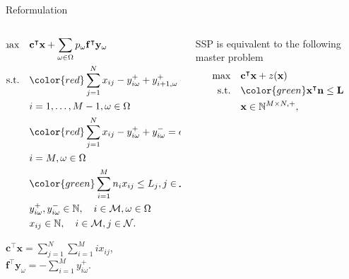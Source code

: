 \begin{frame}{Reformulation}
  \begin{columns}
    \begin{column}{0.5\textwidth}
      \begin{scriptsize}
        \begin{equation*}
          \begin{aligned}
          \hspace{-10mm}
          \max \quad & \mathbf{c}^{\intercal} \mathbf{x} + \sum_{\omega \in \Omega} p_{\omega} \mathbf{f}^{\intercal} \mathbf{y}_{\omega} \\
          \text {s.t.} \quad & {\color{red}\sum_{j= 1}^{N} x_{ij}-y_{i \omega}^{+}+
          y_{i+1, \omega}^{+} + y_{i \omega}^{-}=d_{i \omega}}, \\ & i = 1,\ldots,M-1, \omega \in \Omega \\
          & {\color{red}\sum_{j= 1}^{N} x_{ij} -y_{i \omega}^{+}+y_{i \omega}^{-}=d_{i \omega}}, \\ & i = M, \omega \in \Omega \\
          & {\color{green}\sum_{i=1}^{M} n_{i} x_{ij} \leq L_j}, j \in \mathcal{N}\\
          & y_{i \omega}^{+}, y_{i \omega}^{-} \in \mathbb{N}, \quad i \in \mathcal{M}, \omega \in \Omega \\
          & x_{ij} \in \mathbb{N}, \quad i \in \mathcal{M}, j \in \mathcal{N}.
          \end{aligned}
        \end{equation*}
        \end{scriptsize}
        \begin{tiny}
              $\mathbf{c}^{\intercal} \mathbf{x} =\sum_{j=1}^{N} \sum_{i=1}^{M} i x_{ij}$, $\mathbf{f}^{\intercal} \mathbf{y}_{\omega} = - \sum_{i=1}^{M} y_{i \omega}^{+}$.
        \end{tiny}
    \end{column}
    \begin{column}{0.5\textwidth}
      \scriptsize
      SSP is equivalent to the following master problem
      \begin{equation}\label{BD_master}
        \begin{aligned}
      \max \quad & \mathbf{c}^{\intercal} \mathbf{x}+ z(\mathbf{x}) \\
      \text {s.t.} \quad & {\color{green}\mathbf{x}^{\intercal} \mathbf{n} \leq \mathbf{L}} \\
      & \mathbf{x} \in \mathbb{N}^{M \times N, +},
      \end{aligned}
      \end{equation}


\end{column}
\end{columns}
\end{frame}
